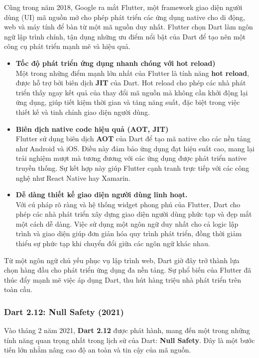 \documentclass[../DoAn.tex]{subfiles}
\numberwithin{figure}{chapter}
\begin{document}
Cũng trong năm 2018, Google ra mắt Flutter, một framework giao diện người dùng (UI) mã nguồn mở cho phép phát triển các ứng dụng native cho di động, web và máy tính để bàn từ một mã nguồn duy nhất. Flutter chọn Dart làm ngôn ngữ lập trình chính, tận dụng những ưu điểm nổi bật của Dart để tạo nên một công cụ phát triển mạnh mẽ và hiệu quả.

\begin{itemize}
    \item \textbf{Tốc độ phát triển ứng dụng nhanh chóng với hot reload)} \\[0.5em]
    Một trong những điểm mạnh lớn nhất của Flutter là tính năng \textbf{hot reload}, được hỗ trợ bởi biên dịch \textbf{JIT} của Dart. Hot reload cho phép các nhà phát triển thấy ngay kết quả của thay đổi mã nguồn mà không cần khởi động lại ứng dụng, giúp tiết kiệm thời gian và tăng năng suất, đặc biệt trong việc thiết kế và tinh chỉnh giao diện người dùng.
    \item \textbf{Biên dịch native code hiệu quả (AOT, JIT)} \\[0.5em]
    Flutter sử dụng biên dịch \textbf{AOT} của Dart để tạo mã native cho các nền tảng như Android và iOS. Điều này đảm bảo ứng dụng đạt hiệu suất cao, mang lại trải nghiệm mượt mà tương đương với các ứng dụng được phát triển native truyền thống. Sự kết hợp này giúp Flutter cạnh tranh trực tiếp với các công nghệ như React Native hay Xamarin.
    \item \textbf{Dễ dàng thiết kế giao diện người dùng linh hoạt.} \\[0.5em]
    Với cú pháp rõ ràng và hệ thống widget phong phú của Flutter, Dart cho phép các nhà phát triển xây dựng giao diện người dùng phức tạp và đẹp mắt một cách dễ dàng. Việc sử dụng một ngôn ngữ duy nhất cho cả logic lập trình và giao diện giúp đơn giản hóa quy trình phát triển, đồng thời giảm thiểu sự phức tạp khi chuyển đổi giữa các ngôn ngữ khác nhau.
\end{itemize}

Từ một ngôn ngữ chủ yếu phục vụ lập trình web, Dart giờ đây trở thành lựa chọn hàng đầu cho phát triển ứng dụng đa nền tảng. Sự phổ biến của Flutter đã thúc đẩy mạnh mẽ việc áp dụng Dart, thu hút hàng triệu nhà phát triển trên toàn cầu.

\subsubsection{Dart 2.12: Null Safety (2021)}

Vào tháng 2 năm 2021, \textbf{Dart 2.12} được phát hành, mang đến một trong những tính năng quan trọng nhất trong lịch sử của Dart: \textbf{Null Safety}. Đây là một bước tiến lớn nhằm nâng cao độ an toàn và tin cậy của mã nguồn.
\end{document}
